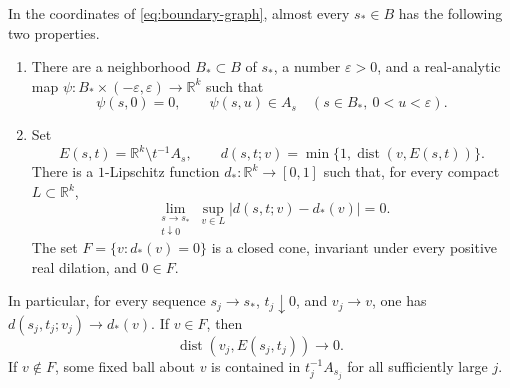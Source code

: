\begin{proposition}
\label{prop:boundary-data}
In the coordinates of \eqref{eq:boundary-graph}, almost every $s_*\in B$ has the following two properties.
\begin{enumerate}[label=\textup{(\roman*)}]
\item There are a neighborhood $B_*\subset B$ of $s_*$, a number
$\varepsilon>0$, and a real-analytic map $\psi:B_*\times(-\varepsilon,\varepsilon)\to\mathbb{R}^k$ such that
\[
 \psi(s,0)=0,\qquad
 \psi(s,u)\in A_s\quad(s\in B_*,\ 0<u<\varepsilon).
\]
\item Set
\[
 E(s,t)=\mathbb{R}^k\setminus t^{-1}A_s,
 \qquad d(s,t;v)=\min\{1,\operatorname{dist}(v,E(s,t))\}.
\]
There is a $1$-Lipschitz function $d_*:\mathbb{R}^k\to[0,1]$ such that, for every compact $L\subset\mathbb{R}^k$,
\begin{equation}
 \lim_{\substack{s\to s_*\\t\downarrow0}}
       \sup_{v\in L}|d(s,t;v)-d_*(v)|=0.
 \label{eq:joint-offset-limit}
\end{equation}
The set $F=\{v:d_*(v)=0\}$ is a closed cone, invariant under every positive real dilation, and $0\in F$.
\end{enumerate}
In particular, for every sequence $s_j\to s_*$, $t_j\downarrow0$, and $v_j\to v$, one has $d(s_j,t_j;v_j)\to d_*(v)$.  If $v\in F$, then
\[
 \operatorname{dist}(v_j,E(s_j,t_j))\longrightarrow0.
\]
If $v\notin F$, some fixed ball about $v$ is contained in $t_j^{-1}A_{s_j}$ for all sufficiently large $j$.
\end{proposition}


